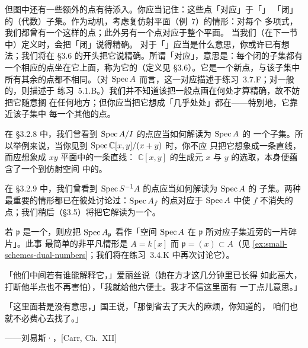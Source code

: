 但图中还有一些额外的点有待添入。你应当记住：这些点「对应」于「\trIrreducible」
「闭」的（代数）子集。作为动机，考虑复仿射平面（例~7）的情形：对每个%
\trIrreducible{}多项式，我们都曾有一个这样的点；此外另有一个点对应于整个平面。
当我们（在下一节中）定义\trZariskiTopology{}时，会把「闭」说得精确。
对于「\trIrreducible」应当是什么意思，你或许已有想法；我们将在
\S3.6 的开头把它说精确。所谓「对应」，意思是：每个闭的\trIrreducible{}子集都有
一个相应的点坐在它上面，称为它的\trGenericPoint（定义见 \S3.6）。它是一个新点，与该子集中所有其余的点都不相同。（对
$\operatorname{Spec} A$ 而言，这一对应描述于练习~3.7.F；对一般的\trScheme{}，则描述于
练习~5.1.B。）我们并不知道该把一般点画在何处才算精确，故不妨把它随意搁
在任何地方；但你应当把它想成「几乎处处」都在——特别地，它靠近该子集中
每一个其他的点。

在 \S3.2.8 中，我们曾看到 $\operatorname{Spec} A/I$ 的点应当如何解读为 $\operatorname{Spec} A$ 的
一个子集。所以举例来说，当你见到 $\operatorname{Spec} \mathbb{C}[x,y]/(x+y)$ 时，你不应
只把它想象成一条直线，而应想象成 $xy$ 平面中的一条直线：\trAlgebra{}
$\mathbb{C}[x,y]$ 的生成元 $x$ 与 $y$ 的选取，本身便蕴含了一个到仿射空间
中的\trInclusionMap{}。

在 \S3.2.9 中，我们曾看到 $\operatorname{Spec} S^{-1}A$ 的点应当如何解读为 $\operatorname{Spec} A$ 的
子集。两种最重要的情形都已在彼处讨论过：$\operatorname{Spec} A_f$ 的点对应于 $\operatorname{Spec} A$
中使 $f$ 不消失的点；我们稍后（\S3.5）将把它解读为一个\trDistinguishedOpen。

若 $\mathfrak{p}$ 是一个\trPrimeIdeal{}，则应把 $\operatorname{Spec} A_{\mathfrak{p}}$
看作「空间 $\operatorname{Spec} A$ 在 $\mathfrak{p}$ 所对应子集近旁的一片碎片」。此事
最简单的非平凡情形是 $A=k[x]$ 而 $\mathfrak{p}=(x)\subset A$（见
\cref{ex:small-schemes-dual-numbers}；我们将在练习~3.4.K 中再次讨论它）。

\epigraph
  {「他们中间若有谁能解释它，」爱丽丝说（她在方才这几分钟里已长得
   如此高大，打断他半点也不再害怕），「我就给他六便士。我才不信这里面有
   一丁点儿意思。」

   「这里面若是没有意思，」国王说，「那倒省去了天大的麻烦，你知道的，
   咱们也就不必费心去找了。」}
  {——刘易斯·\trCarroll，[Carr, Ch.~XII]}
